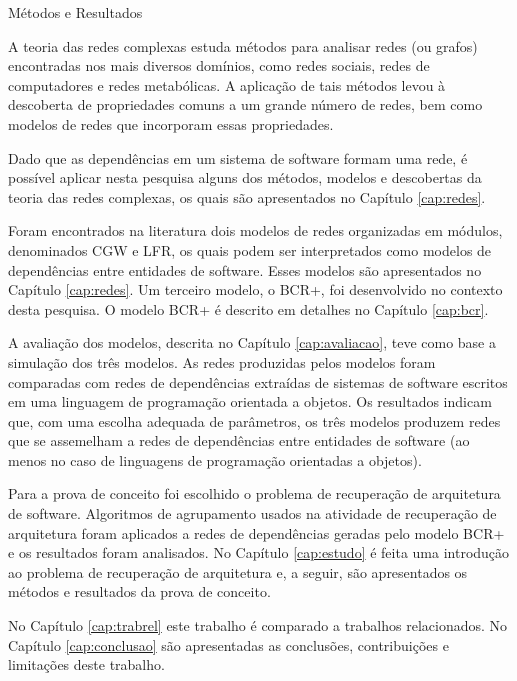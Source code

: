 \begin{section}{Métodos e Resultados}
	
	A teoria das redes complexas estuda métodos para analisar redes (ou grafos) encontradas nos mais diversos domínios, como redes sociais, redes de computadores e redes metabólicas. A aplicação de tais métodos levou à descoberta de propriedades comuns a um grande número de redes, bem como modelos de redes que incorporam essas propriedades.
	
	Dado que as dependências em um sistema de software formam uma rede, é possível aplicar nesta pesquisa alguns dos métodos, modelos e descobertas da teoria das redes complexas, os quais são apresentados no Capítulo \ref{cap:redes}.
	
	Foram encontrados na literatura dois modelos de redes organizadas em módulos, denominados CGW e LFR, os quais podem ser interpretados como modelos de dependências entre entidades de software. Esses modelos são apresentados no Capítulo \ref{cap:redes}. Um terceiro modelo, o BCR+, foi desenvolvido no contexto desta pesquisa. O modelo BCR+ é descrito em detalhes no Capítulo \ref{cap:bcr}.
	
	A avaliação dos modelos, descrita no Capítulo \ref{cap:avaliacao}, teve como base a simulação dos três modelos. As redes produzidas pelos modelos foram comparadas com redes de dependências extraídas de sistemas de software escritos em uma linguagem de programação orientada a objetos. Os resultados indicam que, com uma escolha adequada de parâmetros, os três modelos produzem redes que se assemelham a redes de dependências entre entidades de software (ao menos no caso de linguagens de programação orientadas a objetos).
	
	Para a prova de conceito foi escolhido o problema de recuperação de arquitetura de software. Algoritmos de agrupamento usados na atividade de recuperação de arquitetura foram aplicados a redes de dependências geradas pelo modelo BCR+ e os resultados foram analisados. No Capítulo \ref{cap:estudo} é feita uma introdução ao problema de recuperação de arquitetura e, a seguir, são apresentados os métodos e resultados da prova de conceito.
	
	No Capítulo \ref{cap:trabrel} este trabalho é comparado a trabalhos relacionados. No Capítulo \ref{cap:conclusao} são apresentadas as conclusões, contribuições e limitações deste trabalho.
	
	
\end{section}
